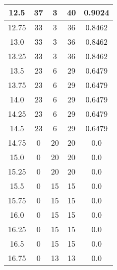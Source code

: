 \documentclass[letterpaper, 12pt]{article}
\begin{document}
\begin{longtable}{|c|c|c|c|c|}
12.5 & 37 & 3 & 40 & 0.9024 \\
\hline
12.75 & 33 & 3 & 36 & 0.8462 \\
\hline
13.0 & 33 & 3 & 36 & 0.8462 \\
\hline
13.25 & 33 & 3 & 36 & 0.8462 \\
\hline
13.5 & 23 & 6 & 29 & 0.6479 \\
\hline
13.75 & 23 & 6 & 29 & 0.6479 \\
\hline
14.0 & 23 & 6 & 29 & 0.6479 \\
\hline
14.25 & 23 & 6 & 29 & 0.6479 \\
\hline
14.5 & 23 & 6 & 29 & 0.6479 \\
\hline
14.75 & 0 & 20 & 20 & 0.0 \\
\hline
15.0 & 0 & 20 & 20 & 0.0 \\
\hline
15.25 & 0 & 20 & 20 & 0.0 \\
\hline
15.5 & 0 & 15 & 15 & 0.0 \\
\hline
15.75 & 0 & 15 & 15 & 0.0 \\
\hline
16.0 & 0 & 15 & 15 & 0.0 \\
\hline
16.25 & 0 & 15 & 15 & 0.0 \\
\hline
16.5 & 0 & 15 & 15 & 0.0 \\
\hline
16.75 & 0 & 13 & 13 & 0.0 \\
\hline
\end{longtable}
\end{document}
